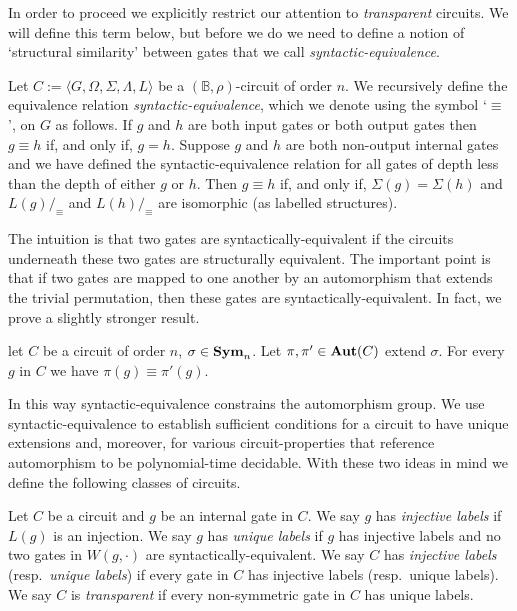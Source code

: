 \documentclass[a4paper,UKenglish]{lipics-v2018}
\begin{document}
In order to proceed we explicitly restrict our attention to \emph{transparent}
circuits. We will define this term below, but before we do we need to define a
notion of `structural similarity' between gates that we call
\emph{syntactic-equivalence}.

\begin{definition}
  Let $C := \langle G, \Omega, \Sigma, \Lambda, L \rangle$ be a $(\mathbb{B},
  \rho)$-circuit of order $n$. We recursively define the equivalence relation
  \emph{syntactic-equivalence}, which we denote using the symbol `$\equiv$', on
  $G$ as follows. If $g$ and $h$ are both input gates or both output gates then
  $g \equiv h$ if, and only if, $g = h$. Suppose $g$ and $h$ are both non-output
  internal gates and we have defined the syntactic-equivalence relation for all
  gates of depth less than the depth of either $g$ or $h$. Then $g \equiv h$ if,
  and only if, $\Sigma(g) = \Sigma (h)$ and $L(g) /_\equiv$ and $L(h) /_\equiv$
  are isomorphic (as labelled structures).
\end{definition}

The intuition is that two gates are syntactically-equivalent if the circuits
underneath these two gates are structurally equivalent. The important point is
that if two gates are mapped to one another by an automorphism that extends the
trivial permutation, then these gates are syntactically-equivalent. In fact, we
prove a slightly stronger result.

\begin{lemma}
  let $C$ be a circuit of order $n$, $\sigma \in \text{\textbf{Sym}}_n$. Let $\pi, \pi' \in
  \text{\textbf{Aut}}(C)$ extend $\sigma$. For every $g$ in $C$ we have $\pi (g) \equiv \pi'
  (g)$.
  \label{lem:permutation-extending-syntactic-equivalence}
\end{lemma}

In this way syntactic-equivalence constrains the automorphism group. We use
syntactic-equivalence to establish sufficient conditions for a circuit to have
unique extensions and, moreover, for various circuit-properties that reference
automorphism to be polynomial-time decidable. With these two ideas in mind we
define the following classes of circuits.

\begin{definition}
  Let $C$ be a circuit and $g$ be an internal gate in $C$. We say $g$ has
  \emph{injective labels} if $L(g)$ is an injection. We say $g$ has \emph{unique
    labels} if $g$ has injective labels and no two gates in $W(g, \cdot)$ are
  syntactically-equivalent. We say $C$ has \emph{injective labels} (resp.\
  \emph{unique labels}) if every gate in $C$ has injective labels (resp.\ unique
  labels). We say $C$ is \emph{transparent} if every non-symmetric gate in $C$
  has unique labels.
\end{definition}
\end{document}
